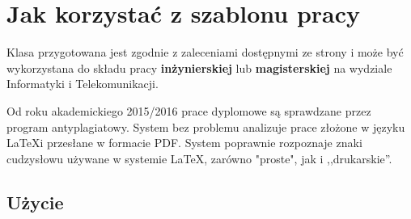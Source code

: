 

\chapter{Jak korzystać z szablonu pracy}

Klasa przygotowana jest zgodnie z zaleceniami dostępnymi ze strony \url{} i może być wykorzystana do składu pracy \textbf{inżynierskiej} lub \textbf{magisterskiej} na wydziale Informatyki i Telekomunikacji.


Od roku akademickiego 2015/2016 prace dyplomowe są sprawdzane przez program antyplagiatowy. System bez problemu analizuje prace złożone w języku \LaTeX i przesłane w formacie PDF. System poprawnie rozpoznaje znaki cudzysłowu używane w systemie \LaTeX, zarówno "proste", jak i ,,drukarskie''.

\section{Użycie}

